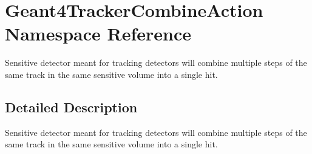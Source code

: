 \hypertarget{namespace_geant4_tracker_combine_action}{}\section{Geant4\+Tracker\+Combine\+Action Namespace Reference}
\label{namespace_geant4_tracker_combine_action}


Sensitive detector meant for tracking detectors will combine multiple steps of the same track in the same sensitive volume into a single hit.  




\subsection{Detailed Description}
Sensitive detector meant for tracking detectors will combine multiple steps of the same track in the same sensitive volume into a single hit. 
